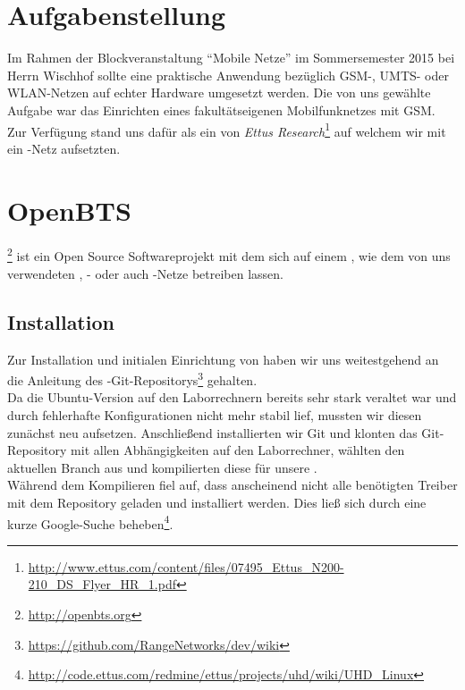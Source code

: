 \section{Aufgabenstellung}
\label{sec:aufgabe}

Im Rahmen der Blockveranstaltung ``Mobile Netze'' im Sommersemester 2015 bei Herrn Wischhof sollte eine praktische Anwendung bezüglich GSM-, UMTS- oder WLAN-Netzen auf echter Hardware umgesetzt werden. Die von uns gewählte Aufgabe war das Einrichten eines fakultätseigenen Mobilfunknetzes mit GSM.
Zur Verfügung stand uns dafür als \SDR ein \USRP von \emph{Ettus Research}\footnote{\url{http://www.ettus.com/content/files/07495_Ettus_N200-210_DS_Flyer_HR_1.pdf}} auf welchem wir mit \OpenBTS ein \GSM-Netz aufsetzten.

\section{OpenBTS}
\label{sec:openbts}

\OpenBTS\footnote{\url{http://openbts.org}} ist ein Open Source Softwareprojekt mit dem sich auf einem \SDR, wie dem von uns verwendeten , \GSM- oder auch \UMTS-Netze betreiben lassen.

\subsection{Installation}
\label{sec:installation}

Zur Installation und initialen Einrichtung von \OpenBTS haben wir uns weitestgehend an die Anleitung des \OpenBTS-Git-Repositorys\footnote{\url{https://github.com/RangeNetworks/dev/wiki}} gehalten.\\Da die Ubuntu-Version  auf den Laborrechnern bereits sehr stark veraltet war und durch fehlerhafte Konfigurationen nicht mehr stabil lief, mussten wir diesen zunächst neu aufsetzen. 
Anschließend installierten wir Git und klonten das Git-Repository mit allen Abhängigkeiten auf den Laborrechner, wählten den aktuellen Branch aus und kompilierten diese für unsere \USRP.\\
Während dem Kompilieren fiel auf, dass anscheinend nicht alle benötigten Treiber mit dem Repository geladen und installiert werden. Dies ließ sich durch eine kurze Google-Suche beheben\footnote{\url{http://code.ettus.com/redmine/ettus/projects/uhd/wiki/UHD_Linux}}.

